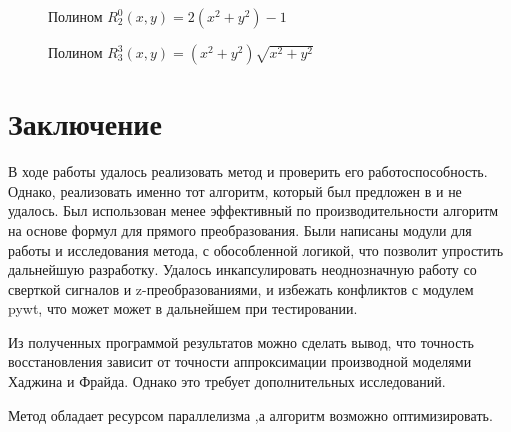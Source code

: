 \documentclass[oneside, final, 14pt]{article}
\begin{document}
\begin{figure}
\caption{Полином $R_2^0(x,y) = 2(x^2 + y^2) - 1$}
\end{figure}
\begin{figure}
\caption{Полином $R_3^3(x,y) = (x^2 + y^2)\sqrt{x^2 + y^2}$}
\end{figure}
\newpage
\section{Заключение}
В ходе работы удалось реализовать метод и проверить его работоспособность. Однако, реализовать именно тот алгоритм, который был предложен в \cite{new_method1} и \cite{new_method2} не удалось. Был использован менее эффективный по производительности алгоритм на основе формул для прямого преобразования. Были написаны модули для работы и исследования метода, с обособленной логикой, что позволит упростить дальнейшую разработку. Удалось инкапсулировать неоднозначную работу со сверткой сигналов и z-преобразованиями, и избежать конфликтов с модулем pywt, что может может в дальнейшем при тестировании. 

Из полученных программой результатов можно сделать вывод, что точность восстановления зависит от точности аппроксимации производной моделями Хаджина и Фрайда. Однако это требует дополнительных исследований.

Метод обладает ресурсом параллелизма ,а алгоритм возможно оптимизировать.
\newpage

\end{document}
